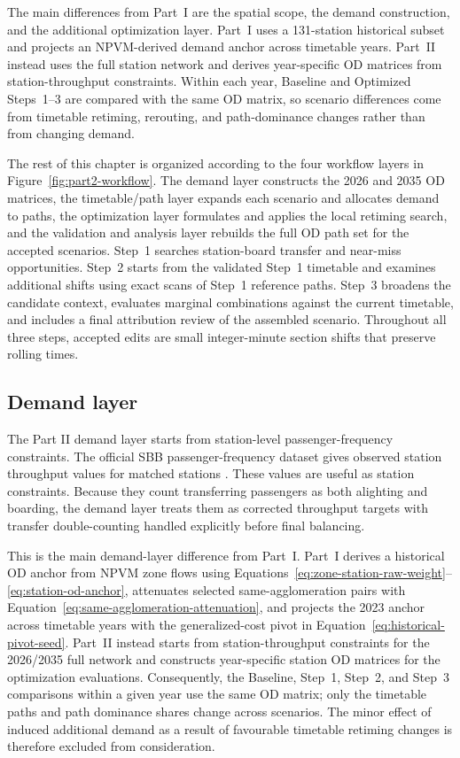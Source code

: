 \documentclass[preprint,12pt]{elsarticle}
\begin{document}
The main differences from Part~I are the spatial scope, the demand construction, and the additional optimization layer. Part~I uses a 131-station historical subset and projects an NPVM-derived demand anchor across timetable years. Part~II instead uses the full station network and derives year-specific OD matrices from station-throughput constraints. Within each year, Baseline and Optimized Steps~1--3 are compared with the same OD matrix, so scenario differences come from timetable retiming, rerouting, and path-dominance changes rather than from changing demand.


The rest of this chapter is organized according to the four workflow layers in Figure~\ref{fig:part2-workflow}. The demand layer constructs the 2026 and 2035 OD matrices, the timetable/path layer expands each scenario and allocates demand to paths, the optimization layer formulates and applies the local retiming search, and the validation and analysis layer rebuilds the full OD path set for the accepted scenarios. Step~1 searches station-board transfer and near-miss opportunities. Step~2 starts from the validated Step~1 timetable and examines additional shifts using exact scans of Step~1 reference paths. Step~3 broadens the candidate context, evaluates marginal combinations against the current timetable, and includes a final attribution review of the assembled scenario. Throughout all three steps, accepted edits are small integer-minute section shifts that preserve rolling times.

\subsection{Demand layer}\label{sec:methods-part2-demand}
The Part II demand layer starts from station-level passenger-frequency constraints. The official SBB passenger-frequency dataset gives observed station throughput values for matched stations \citep{sbbPassagierfrequenzDataset2026}. These values are useful as station constraints. Because they count transferring passengers as both alighting and boarding, the demand layer treats them as corrected throughput targets with transfer double-counting handled explicitly before final balancing.

This is the main demand-layer difference from Part~I. Part~I derives a historical OD anchor from NPVM zone flows using Equations~\eqref{eq:zone-station-raw-weight}--\eqref{eq:station-od-anchor}, attenuates selected same-agglomeration pairs with Equation~\eqref{eq:same-agglomeration-attenuation}, and projects the 2023 anchor across timetable years with the generalized-cost pivot in Equation~\eqref{eq:historical-pivot-seed}. Part~II instead starts from station-throughput constraints for the 2026/2035 full network and constructs year-specific station OD matrices for the optimization evaluations. Consequently, the Baseline, Step~1, Step~2, and Step~3 comparisons within a given year use the same OD matrix; only the timetable paths and path dominance shares change across scenarios. The minor effect of induced additional demand as a result of favourable timetable retiming changes is therefore excluded from consideration.
\end{document}
